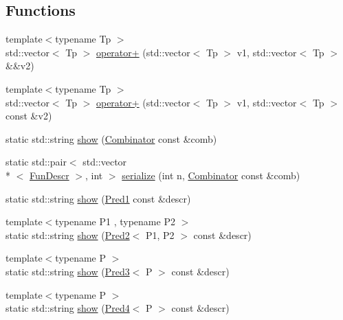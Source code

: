 \subsection*{Functions}
\begin{DoxyCompactItemize}
\item 
{\footnotesize template$<$typename Tp $>$ }\\std\+::vector$<$ Tp $>$ \hyperlink{namespacepfq__lang_1_1term_af3a95f621a668366d2ac1fb5f40a0387}{operator+} (std\+::vector$<$ Tp $>$ v1, std\+::vector$<$ Tp $>$ \&\&v2)
\item 
{\footnotesize template$<$typename Tp $>$ }\\std\+::vector$<$ Tp $>$ \hyperlink{namespacepfq__lang_1_1term_ada22d7ede3289952e9e56063fd2b2481}{operator+} (std\+::vector$<$ Tp $>$ v1, std\+::vector$<$ Tp $>$ const \&v2)
\item 
static std\+::string \hyperlink{namespacepfq__lang_1_1term_a1c6f67209bcea01f775438b2d7871b1f}{show} (\hyperlink{structpfq__lang_1_1term_1_1Combinator}{Combinator} const \&comb)
\item 
static std\+::pair$<$ std\+::vector\\*
$<$ \hyperlink{structpfq__lang_1_1FunDescr}{Fun\+Descr} $>$, int $>$ \hyperlink{namespacepfq__lang_1_1term_a56081fd4c7d006cb4c9936d191458640}{serialize} (int n, \hyperlink{structpfq__lang_1_1term_1_1Combinator}{Combinator} const \&comb)
\item 
static std\+::string \hyperlink{namespacepfq__lang_1_1term_a7b0962b23cd37fac436770d3fc48a301}{show} (\hyperlink{structpfq__lang_1_1term_1_1Pred1}{Pred1} const \&descr)
\item 
{\footnotesize template$<$typename P1 , typename P2 $>$ }\\static std\+::string \hyperlink{namespacepfq__lang_1_1term_a47537eae99f694ad7f88a1f854bd7d5e}{show} (\hyperlink{structpfq__lang_1_1term_1_1Pred2}{Pred2}$<$ P1, P2 $>$ const \&descr)
\item 
{\footnotesize template$<$typename P $>$ }\\static std\+::string \hyperlink{namespacepfq__lang_1_1term_a75e27db2005f2687c7c01a6695812260}{show} (\hyperlink{structpfq__lang_1_1term_1_1Pred3}{Pred3}$<$ P $>$ const \&descr)
\item 
{\footnotesize template$<$typename P $>$ }\\static std\+::string \hyperlink{namespacepfq__lang_1_1term_a94e2082634ed6fdb1543464bcb8dd1f3}{show} (\hyperlink{structpfq__lang_1_1term_1_1Pred4}{Pred4}$<$ P $>$ const \&descr)

\end{DoxyCompactItemize}
